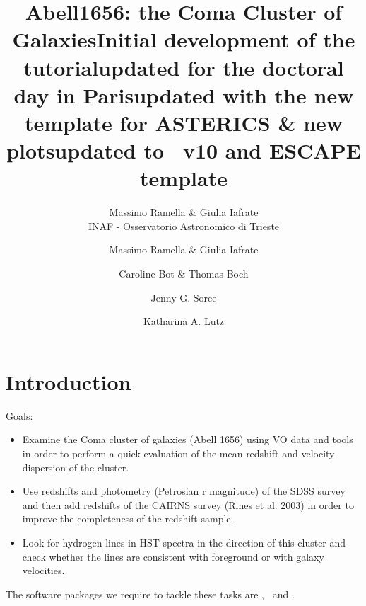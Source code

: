 \documentclass [a4paper, 12pt]{article}
\begin{document}
\author{Massimo Ramella \& Giulia Iafrate \\      %
INAF - Osservatorio Astronomico di Trieste}       %
\title{Abell1656: the Coma Cluster of Galaxies}   %
\makeescapetitle

\newpage
\author{Massimo Ramella \& Giulia Iafrate}   %
\title{Initial development of the tutorial}  %
\addescapehistory
\author{Caroline Bot \& Thomas Boch}
\title{updated for the doctoral day in Paris}
\addescapehistory
\author{Jenny G. Sorce}
\title{updated with the new template for ASTERICS \& new plots}
\addescapehistory
\author{Katharina A. Lutz}
\title{updated to \aladin\ v10 and ESCAPE template}
\addescapehistory

\newpage
\tableofcontents

\newpage
\section{Introduction}
Goals:
\begin{itemize}
\item  Examine the Coma cluster of galaxies (Abell 1656) using VO data and tools in order to perform a quick evaluation of the mean redshift and velocity dispersion of the cluster.
\item Use redshifts and photometry (Petrosian r magnitude) of the SDSS survey and then add redshifts of the CAIRNS survey (Rines et al. 2003) in order to improve the completeness of the redshift sample.
\item Look for hydrogen lines in HST spectra in the direction of this cluster and check whether the lines are consistent with foreground or with galaxy velocities.\\
\end{itemize}
\noindent The software packages we require to tackle these tasks are \aladin,
\topcat\ and \cassis.
\end{document}
